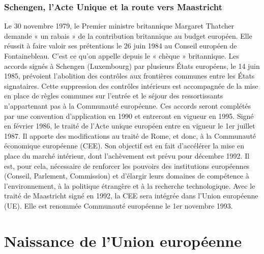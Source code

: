 \documentclass{report}%
\begin{document}
\subsection{Schengen, l'Acte Unique et la route vers Maastricht}
Le 30 novembre 1979, le Premier ministre britannique Margaret Thatcher demande « un rabais » de la contribution britannique au budget européen. Elle réussit à faire valoir ses prétentions le 26 juin 1984 au Conseil européen de Fontainebleau. C'est ce qu'on appelle depuis le « chèque » britannique.
Les accords signés à Schengen (Luxembourg) par plusieurs États européens, le 14 juin 1985, prévoient l'abolition des contrôles aux frontières communes entre les États signataires. Cette suppression des contrôles intérieurs est accompagnée de la mise en place de règles communes sur l'entrée et le séjour des ressortissants n'appartenant pas à la Communauté européenne. Ces accords seront complétés par une convention d'application en 1990 et entreront en vigueur en 1995.
Signé en février 1986, le traité de l’Acte unique européen entre en vigueur le 1er juillet 1987. Il apporte des modifications au traité de Rome, et donc, à la Communauté économique européenne (CEE). Son objectif est en fait d’accélérer la mise en place du marché intérieur, dont l’achèvement est prévu pour décembre 1992. Il est, pour cela, nécessaire de renforcer les pouvoirs des institutions européennes (Conseil, Parlement, Commission) et d’élargir leurs domaines de compétence à l’environnement, à la politique étrangère et à la recherche technologique.
Avec le traité de Maastricht signé en 1992, la CEE sera intégrée dans l'Union européenne (UE). Elle est renommée Communauté européenne le 1er novembre 1993.
\chapter{Naissance de l'Union européenne}
\end{document}

